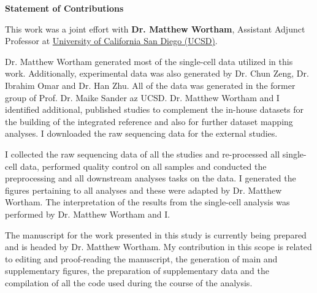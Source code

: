 \begin{Comment2}

\vspace{5mm}
\label{contr:chp3_meta_analysis}
\hspace{-3mm}

\textbf{\large Statement of Contributions} \\

\par This work was a joint effort with \textbf{Dr. Matthew Wortham}, Assistant Adjunct Professor at \href{https://ucsd.edu/}{University of California San Diego (UCSD)}.\\

\par Dr. Matthew Wortham generated most of the single-cell data utilized in this work. Additionally, experimental data was also generated by Dr. Chun Zeng, Dr. Ibrahim Omar and Dr. Han Zhu. All of the data was generated in the former group of Prof. Dr. Maike Sander az UCSD. Dr. Matthew Wortham and I identified additional, published studies to complement the in-house datasets for the building of the integrated reference and also for further dataset mapping analyses. I downloaded the raw sequencing data for the external studies.\\

\par I collected the raw sequencing data of all the studies and re-processed all single-cell data, performed quality control on all samples and conducted the preprocessing and all downstream analyses tasks on the data. I generated the figures pertaining to all analyses and these were adapted by Dr. Matthew Wortham. The interpretation of the results from the single-cell analysis was performed by Dr. Matthew Wortham and I.\\

\par The manuscript for the work presented in this study is currently being prepared and is headed by Dr. Matthew Wortham. My contribution in this scope is related to editing and proof-reading the manuscript, the generation of main and supplementary figures, the preparation of supplementary data and the compilation of all the code used during the course of the analysis.\\

\end{Comment2}

%


